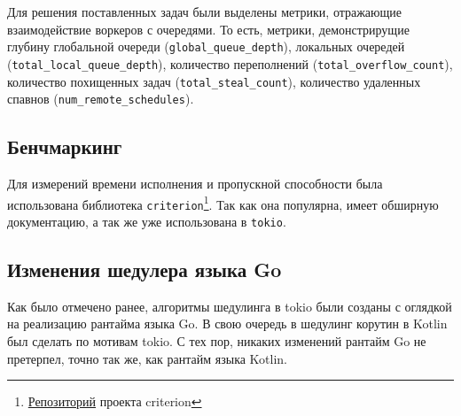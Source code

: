 Для решения поставленных задач были выделены метрики, отражающие взаимодействие воркеров с очередями. То есть, метрики, демонстрирущие глубину глобальной очереди (\verb|global_queue_depth|), локальных очередей (\verb|total_local_queue_depth|), количество переполнений (\verb|total_overflow_count|), количество похищенных задач (\verb|total_steal_count|), количество удаленных спавнов (\verb|num_remote_schedules|).

\subsection{Бенчмаркинг}

Для измерений времени исполнения и пропускной способности была использована библиотека \verb|criterion|\footnote{\href{https://github.com/bheisler/criterion.rs}{Репозиторий} проекта criterion}. Так как она популярна, имеет обширную документацию, а так же уже использована в \verb|tokio|.

\subsection{Изменения шедулера языка Go}

Как было отмечено ранее, алгоритмы шедулинга в tokio были созданы с оглядкой на реализацию рантайма языка Go. В свою очередь в шедулинг корутин в Kotlin был сделать по мотивам tokio. С тех пор, никаких изменений рантайм Go не претерпел, точно так же, как рантайм языка Kotlin.
